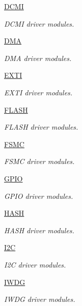 \begin{DoxyCompactItemize}
\hyperlink{group___d_c_m_i}{D\+C\+M\+I}
\begin{DoxyCompactList}\small\item\em D\+C\+M\+I driver modules. \end{DoxyCompactList}\item 
\hyperlink{group___d_m_a}{D\+M\+A}
\begin{DoxyCompactList}\small\item\em D\+M\+A driver modules. \end{DoxyCompactList}\item 
\hyperlink{group___e_x_t_i}{E\+X\+T\+I}
\begin{DoxyCompactList}\small\item\em E\+X\+T\+I driver modules. \end{DoxyCompactList}\item 
\hyperlink{group___f_l_a_s_h}{F\+L\+A\+S\+H}
\begin{DoxyCompactList}\small\item\em F\+L\+A\+S\+H driver modules. \end{DoxyCompactList}\item 
\hyperlink{group___f_s_m_c}{F\+S\+M\+C}
\begin{DoxyCompactList}\small\item\em F\+S\+M\+C driver modules. \end{DoxyCompactList}\item 
\hyperlink{group___g_p_i_o}{G\+P\+I\+O}
\begin{DoxyCompactList}\small\item\em G\+P\+I\+O driver modules. \end{DoxyCompactList}\item 
\hyperlink{group___h_a_s_h}{H\+A\+S\+H}
\begin{DoxyCompactList}\small\item\em H\+A\+S\+H driver modules. \end{DoxyCompactList}\item 
\hyperlink{group___i2_c}{I2\+C}
\begin{DoxyCompactList}\small\item\em I2\+C driver modules. \end{DoxyCompactList}\item 
\hyperlink{group___i_w_d_g}{I\+W\+D\+G}
\begin{DoxyCompactList}\small\item\em I\+W\+D\+G driver modules. \end{DoxyCompactList}\item 

\end{DoxyCompactItemize}
